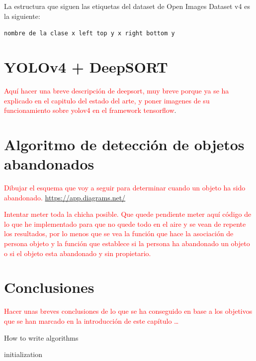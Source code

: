 La estructura que siguen las etiquetas del dataset de Open Images Dataset v4 es la siguiente:

\texttt{nombre de la clase x left top y x right bottom y}


\newpage

\section{YOLOv4 + DeepSORT}
\label{sec:desarrollo-yolov4+deepsort}

\textcolor{red}{Aquí hacer una breve descripción de deepsort, muy breve porque ya se ha explicado en el capitulo del estado del arte, y poner imagenes de su funcionamiento sobre yolov4 en el framework tensorflow}.

\newpage

\section{Algoritmo de detección de objetos abandonados}
\label{sec:algoritmo-object-detection}

\textcolor{red}{Dibujar el esquema que voy a seguir para determinar cuando un objeto ha sido abandonado.}
\url{https://app.diagrams.net/}

\textcolor{red}{Intentar meter toda la chicha posible. Que quede pendiente meter aquí código de lo que he implementado para que no quede todo en el aire y se vean de repente los resultados, por lo menos que se vea la función que hace la asociación de persona objeto y la función que establece si la persona ha abandonado un objeto o si el objeto esta abandonado y sin propietario.}

\newpage

\section{Conclusiones}
\label{sec:conclu-desarrollo}

\textcolor{red}{Hacer unas breves conclusiones de lo que se ha conseguido en base a los objetivos que se han marcado en la introducción de este capítulo \ldots}

\begin{algorithm}[H]
 \caption{How to write algorithms}
 \label{alg:howto}
 initialization\;
\end{algorithm}
